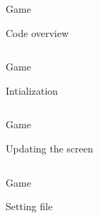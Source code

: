 \documentclass[a4paper,10pt]{beamer}
\begin{document}
\begin{frame}{Game}
\begin{minipage}[t]{0.45\textwidth}
\end{minipage}
\begin{minipage}[t]{0.5\textwidth}
\begin{block}{Code overview}
\begin{center}
\centering
\inputminted[linenos]{python}{pakage.py}
\end{center}
\end{block}
\end{minipage}
\end{frame}

\begin{frame}{Game}
\begin{block}{Intialization}
\inputminted[linenos]{python}{init1.py}
\end{block}
\end{frame}

\begin{frame}{Game}
\begin{block}{Updating the screen}
\inputminted[linenos]{python}{update1.py}
\end{block}
\end{frame}

\begin{frame}{Game}
\begin{block}{Setting file}
\inputminted[linenos]{python}{settings1.py}
\end{block}
\end{frame}
\end{document}
